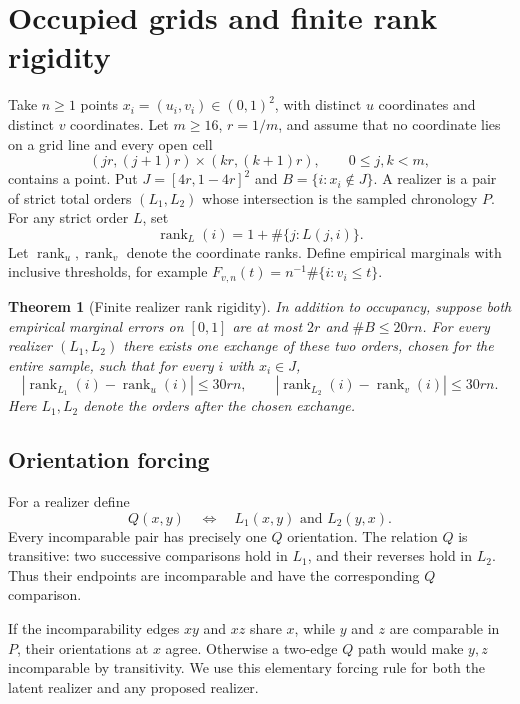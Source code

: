 \documentclass[11pt]{article}
\newtheorem{theorem}{Theorem}[section]
\theoremstyle{remark}
\newcommand{\rank}{\operatorname{rank}}
\begin{document}
\section{Occupied grids and finite rank rigidity}\label{sec:finite}
Take $n\ge1$ points $x_i=(u_i,v_i)\in(0,1)^2$, with distinct $u$
coordinates and distinct $v$ coordinates. Let $m\ge16$, $r=1/m$,
and assume that no coordinate lies on a grid line and every open cell
\[
 (jr,(j+1)r)\times(kr,(k+1)r),\qquad 0\le j,k<m,
\]
contains a point. Put $J=[4r,1-4r]^2$ and
$B=\{i:x_i\notin J\}$. A realizer is a pair of strict total orders
$(L_1,L_2)$ whose intersection is the sampled chronology $P$.
For any strict order $L$, set
\[
 \rank_L(i)=1+\#\{j:L(j,i)\}.
\]
Let $\rank_u,\rank_v$ denote the coordinate ranks. Define empirical
marginals with inclusive thresholds, for example
$F_{v,n}(t)=n^{-1}\#\{i:v_i\le t\}$.

\begin{theorem}[Finite realizer rank rigidity]\label{thm:finite}
In addition to occupancy, suppose both empirical marginal errors on
$[0,1]$ are at most $2r$ and $\#B\le20rn$. For every realizer
$(L_1,L_2)$ there exists one exchange of these two orders, chosen for
the entire sample, such that for every $i$ with $x_i\in J$,
\[
 |\rank_{L_1}(i)-\rank_u(i)|\le30rn,\qquad
 |\rank_{L_2}(i)-\rank_v(i)|\le30rn.
\]
Here $L_1,L_2$ denote the orders after the chosen exchange.
\end{theorem}

\subsection{Orientation forcing}
For a realizer define
\[
 Q(x,y)\quad\Longleftrightarrow\quad L_1(x,y)\text{ and }L_2(y,x).
\]
Every incomparable pair has precisely one $Q$ orientation. The relation
$Q$ is transitive: two successive comparisons hold in $L_1$, and their
reverses hold in $L_2$. Thus their endpoints are incomparable and
have the corresponding $Q$ comparison.

If the incomparability edges $xy$ and $xz$ share $x$, while $y$ and $z$
are comparable in $P$, their orientations at $x$ agree. Otherwise a
two-edge $Q$ path would make $y,z$ incomparable by transitivity.
We use this elementary forcing rule for both the latent realizer and
any proposed realizer.
\end{document}
